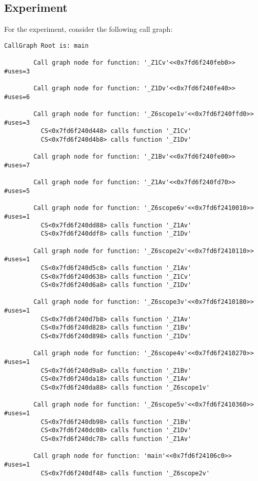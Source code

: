 \documentclass{article}
\begin{document}
\begin{enumerate}[(a)]
      \subsection*{Experiment}
      For the experiment, consider the following call graph:
      \begin{lstlisting}[basicstyle=\small\ttfamily]
        CallGraph Root is: main

        Call graph node for function: '_Z1Cv'<<0x7fd6f240feb0>>  #uses=3

        Call graph node for function: '_Z1Dv'<<0x7fd6f240fe40>>  #uses=6

        Call graph node for function: '_Z6scope1v'<<0x7fd6f240ffd0>>  #uses=3
          CS<0x7fd6f240d448> calls function '_Z1Cv'
          CS<0x7fd6f240d4b8> calls function '_Z1Dv'

        Call graph node for function: '_Z1Bv'<<0x7fd6f240fe00>>  #uses=7

        Call graph node for function: '_Z1Av'<<0x7fd6f240fd70>>  #uses=5

        Call graph node for function: '_Z6scope6v'<<0x7fd6f2410010>>  #uses=1
          CS<0x7fd6f240dd88> calls function '_Z1Av'
          CS<0x7fd6f240ddf8> calls function '_Z1Dv'

        Call graph node for function: '_Z6scope2v'<<0x7fd6f2410110>>  #uses=1
          CS<0x7fd6f240d5c8> calls function '_Z1Av'
          CS<0x7fd6f240d638> calls function '_Z1Cv'
          CS<0x7fd6f240d6a8> calls function '_Z1Dv'

        Call graph node for function: '_Z6scope3v'<<0x7fd6f2410180>>  #uses=1
          CS<0x7fd6f240d7b8> calls function '_Z1Av'
          CS<0x7fd6f240d828> calls function '_Z1Bv'
          CS<0x7fd6f240d898> calls function '_Z1Dv'

        Call graph node for function: '_Z6scope4v'<<0x7fd6f2410270>>  #uses=1
          CS<0x7fd6f240d9a8> calls function '_Z1Bv'
          CS<0x7fd6f240da18> calls function '_Z1Av'
          CS<0x7fd6f240da88> calls function '_Z6scope1v'

        Call graph node for function: '_Z6scope5v'<<0x7fd6f2410360>>  #uses=1
          CS<0x7fd6f240db98> calls function '_Z1Bv'
          CS<0x7fd6f240dc08> calls function '_Z1Dv'
          CS<0x7fd6f240dc78> calls function '_Z1Av'

        Call graph node for function: 'main'<<0x7fd6f24106c0>>  #uses=1
          CS<0x7fd6f240df48> calls function '_Z6scope2v'
      \end{lstlisting}


\end{enumerate}
\end{document}
